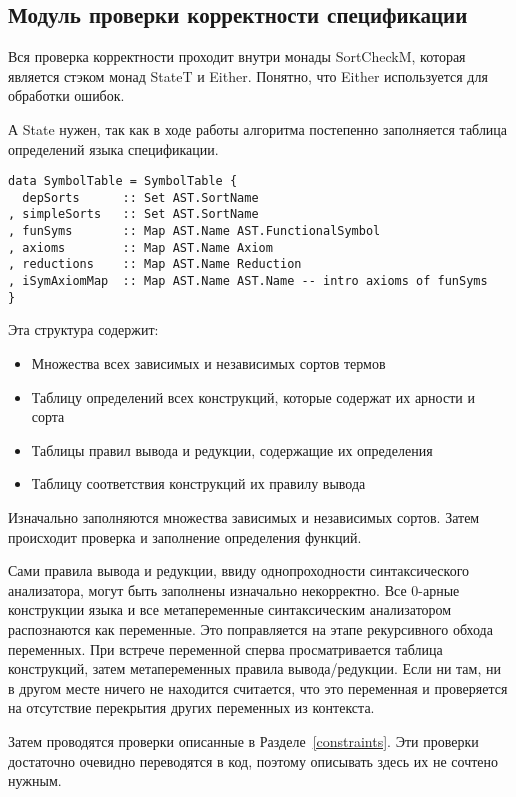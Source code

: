 \subsection{Модуль проверки корректности спецификации}\label{sortcheck}
Вся проверка корректности проходит внутри монады SortCheckM, которая является стэком монад StateT и Either. Понятно, что Either используется для обработки ошибок.

А State нужен, так как в ходе работы алгоритма постепенно заполняется таблица определений языка спецификации.

\begin{lstlisting}[caption={Структура заполняемая модулем проверки спецификации},captionpos=b,frame=single, label={SymTab}]
data SymbolTable = SymbolTable {
  depSorts      :: Set AST.SortName
, simpleSorts   :: Set AST.SortName
, funSyms       :: Map AST.Name AST.FunctionalSymbol
, axioms        :: Map AST.Name Axiom
, reductions    :: Map AST.Name Reduction
, iSymAxiomMap  :: Map AST.Name AST.Name -- intro axioms of funSyms
}
\end{lstlisting}

Эта структура содержит:
\begin{itemize}
\item Множества всех зависимых и независимых сортов термов
\item Таблицу определений всех конструкций, которые содержат их арности и сорта
\item Таблицы правил вывода и редукции, содержащие их определения
\item Таблицу соответствия конструкций их правилу вывода
\end{itemize}

Изначально заполняются множества зависимых и независимых сортов. Затем происходит проверка и заполнение определения функций.

Сами правила вывода и редукции, ввиду однопроходности синтаксического анализатора, могут быть заполнены изначально некорректно. Все 0-арные конструкции языка и все метапеременные синтаксическим анализатором распознаются как переменные. Это поправляется на этапе рекурсивного обхода переменных. При встрече переменной сперва просматривается таблица конструкций, затем метапеременных правила вывода/редукции. Если ни там, ни в другом месте ничего не находится считается, что это переменная и проверяется на отсутствие перекрытия других переменных из контекста.

Затем проводятся проверки описанные в Разделе~\ref{constraints}. Эти проверки достаточно очевидно переводятся в код, поэтому описывать здесь их не сочтено нужным.




















